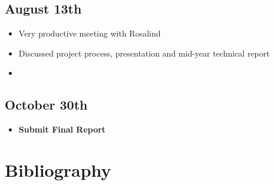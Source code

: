 \documentclass[12pt]{article}
\begin{document}
\subsection{August 13th}
\begin{itemize}
	\item Very productive meeting with Rosalind
	\item Discussed project process, presentation and mid-year technical report
	\item 
\end{itemize}
\subsection{October 30th}
\begin{itemize}
	\item \textbf{Submit Final Report}
\end{itemize}
\section{Bibliography}
\printbibliography
\end{document}
